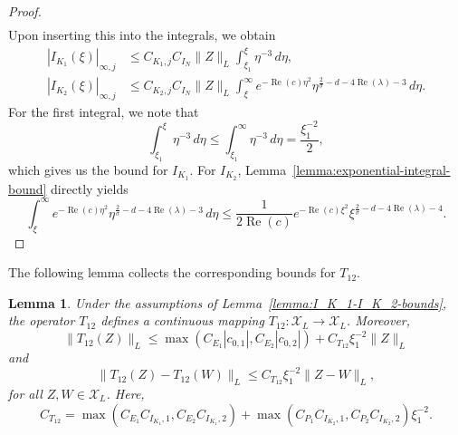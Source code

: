 \documentclass[11pt]{article}
\DeclareMathOperator{\real}{Re}
\newcommand{\Space}{\mathcal{X}}
\newtheorem{lemma}[definition]{Lemma}
\begin{document}
\begin{proof}
\begin{equation*}
\begin{split}
    \end{split}
  \end{equation*}
  Upon inserting this into the integrals, we obtain
  \begin{align*}
    |I_{K_{1}}(\xi)|_{\infty,j}
    &\leq C_{K_{1},j}C_{I_{N}}\|Z\|_{L}\int_{\xi_{1}}^{\xi} \eta^{-3}\,d\eta,\\
    |I_{K_{2}}(\xi)|_{\infty,j}
    &\leq C_{K_{2},j}C_{I_{N}}\|Z\|_{L}\int_{\xi}^{\infty}e^{-\real(c)\eta^{2}}\eta^{\frac{2}{\sigma} - d - 4\real(\lambda) - 3}\,d\eta.
  \end{align*}
  For the first integral, we note that
  \begin{equation*}
    \int_{\xi_{1}}^{\xi} \eta^{-3}\,d\eta \leq \int_{\xi_{1}}^{\infty} \eta^{-3}\,d\eta
    = \frac{\xi_{1}^{-2}}{2},
  \end{equation*}
  which gives us the bound for \(I_{K_{1}}\). For \(I_{K_{2}}\),
  Lemma~\ref{lemma:exponential-integral-bound} directly yields
  \begin{equation*}
    \int_{\xi}^{\infty}e^{-\real(c)\eta^{2}}\eta^{\frac{2}{\sigma} - d - 4\real(\lambda) - 3}\,d\eta
    \leq \frac{1}{2\real(c)}e^{-\real(c)\xi^{2}}\xi^{\frac{2}{\sigma} - d - 4\real(\lambda) - 4}.
  \end{equation*}
\end{proof}

The following lemma collects the corresponding bounds for
\(T_{12}\).

\begin{lemma}\label{lemma:Z-fixed-point-bounds}
  Under the assumptions of Lemma~\ref{lemma:I_K_1-I_K_2-bounds}, the
  operator \(T_{12}\) defines a continuous mapping
  \(T_{12} \colon \Space_{L} \to \Space_{L}\). Moreover,
  \begin{equation}
    \label{eq:T_12-1}
    \|T_{12}(Z)\|_{L} \leq \max(C_{E_{1}}|c_{0,1}|, C_{E_{2}}|c_{0,2}|)
    + C_{T_{12}}\xi_{1}^{-2}\|Z\|_{L}
  \end{equation}
  and
  \begin{equation}
    \label{eq:T_12-2}
    \|T_{12}(Z) - T_{12}(W)\|_{L} \leq C_{T_{12}}\xi_{1}^{-2}\|Z - W\|_{L},
  \end{equation}
  for all \(Z, W \in \Space_{L}\). Here,
  \begin{equation*}
    C_{T_{12}} = \max(C_{E_{1}}C_{I_{K_{1}},1}, C_{E_{2}}C_{I_{K_{1}},2})
    + \max(C_{P_{1}}C_{I_{K_{2}},1}, C_{P_{2}}C_{I_{K_{2}},2})\xi_{1}^{-2}.
  \end{equation*}
\end{lemma}
\end{document}
